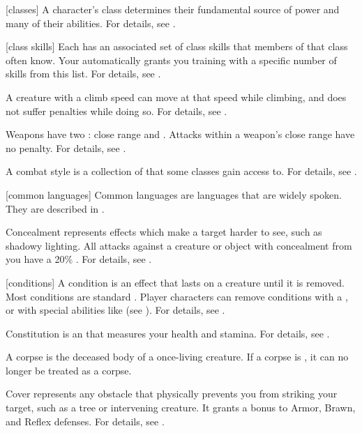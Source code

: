 [classes] A character's class determines their fundamental source of power and many of their abilities.
For details, see .

[class skills] Each  has an associated set of class skills that members of that class often know.
Your  automatically grants you training with a specific number of skills from this list.
For details, see .

 A creature with a climb speed can move at that speed while climbing, and does not suffer penalties while doing so.
For details, see .

 Weapons have two : close range and .
Attacks within a weapon's close range have no penalty.
For details, see .

 A combat style is a collection of  that some classes gain access to.
For details, see .

[common languages] Common languages are languages that are widely spoken.
They are described in .

 Concealment represents effects which make a target harder to see, such as shadowy lighting.
All  attacks against a creature or object with concealment from you have a 20\% .
For details, see .

[conditions] A condition is an effect that lasts on a creature until it is removed.
Most conditions are standard .
Player characters can remove conditions with a , or with special abilities like  (see ).
For details, see .

 Constitution is an  that measures your health and stamina.
For details, see .

 A corpse is the deceased body of a once-living creature.
If a corpse is , it can no longer be treated as a corpse.

 Cover represents any obstacle that physically prevents you from striking your target, such as a tree or intervening creature.
It grants a  bonus to Armor, Brawn, and Reflex defenses.
For details, see .


